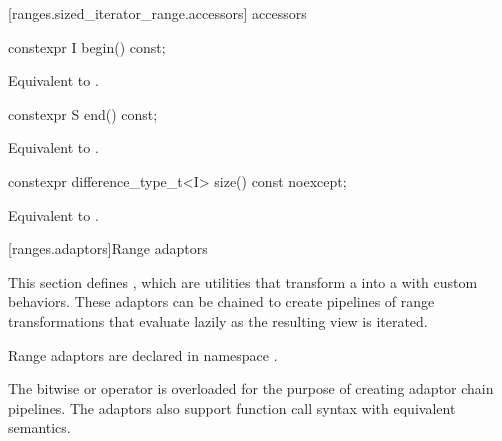[ranges.sized_iterator_range.accessors]{ accessors}

%
\begin{itemdecl}
constexpr I begin() const;
\end{itemdecl}

\begin{itemdescr}
\pnum
\returns Equivalent to .
\end{itemdescr}

%
\begin{itemdecl}
constexpr S end() const;
\end{itemdecl}

\begin{itemdescr}
\pnum
\returns Equivalent to .
\end{itemdescr}

%
\begin{itemdecl}
constexpr difference_type_t<I> size() const noexcept;
\end{itemdecl}

\begin{itemdescr}
\pnum
\returns Equivalent to .
\end{itemdescr}

[ranges.adaptors]{Range adaptors}

\pnum
This section defines , which are utilities that transform a 
into a  with custom behaviors. These adaptors can be chained to create pipelines of
range transformations that evaluate lazily as the resulting view is iterated.

\pnum
Range adaptors are declared in namespace .

\pnum
The bitwise or operator is overloaded for the purpose of creating adaptor chain pipelines. The
adaptors also support function call syntax with equivalent semantics.

\pnum
\enterexample
{}
\exitexample

